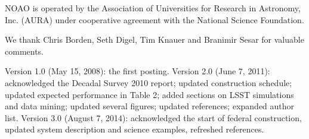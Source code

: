\documentclass{emulateapj}
\begin{document}
NOAO is operated by the Association of Universities for Research in Astronomy,
Inc. (AURA) under cooperative agreement with the National Science Foundation.

We thank Chris Borden, Seth Digel, Tim Knauer and Branimir Sesar for valuable 
comments.



\vskip 0.06in
Version 1.0 (May 15, 2008): the first posting. 
\vskip 0.06in
Version 2.0 (June 7, 2011): acknowledged the Decadal Survey 2010 report; updated construction schedule;
updated expected performance in Table 2; added sections on LSST simulations and data mining;
updated several figures; updated references; expanded author list. 
\vskip 0.06in
Version 3.0 (August 7, 2014): acknowledged the start of federal construction, 
updated system description and science examples, refreshed references. 
\end{document}
